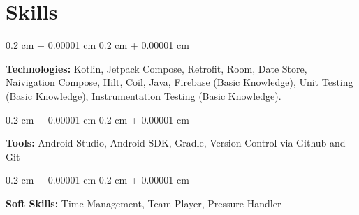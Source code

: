 \documentclass[10pt, letterpaper]{article}
\newenvironment{onecolentry}{
    \begin{adjustwidth}{
        0.2 cm + 0.00001 cm
    }{
        0.2 cm + 0.00001 cm
    }
}{
    \end{adjustwidth}
} %
\begin{document}
    
    \section{Skills}



        
        \begin{onecolentry}
            \textbf{Technologies:} Kotlin, Jetpack Compose, Retrofit, Room, Date Store, Naivigation Compose, Hilt, Coil, Java, Firebase (Basic Knowledge), Unit Testing (Basic Knowledge), Instrumentation Testing (Basic Knowledge).
        \end{onecolentry}

        \vspace{0.2 cm}

        \begin{onecolentry}
            \textbf{Tools:} Android Studio, Android SDK, Gradle, Version Control via Github and Git
        \end{onecolentry}

        \vspace{0.2 cm}

        \begin{onecolentry}
            \textbf{Soft Skills:} Time Management, Team Player, Pressure Handler
        \end{onecolentry}


    
\end{document}
